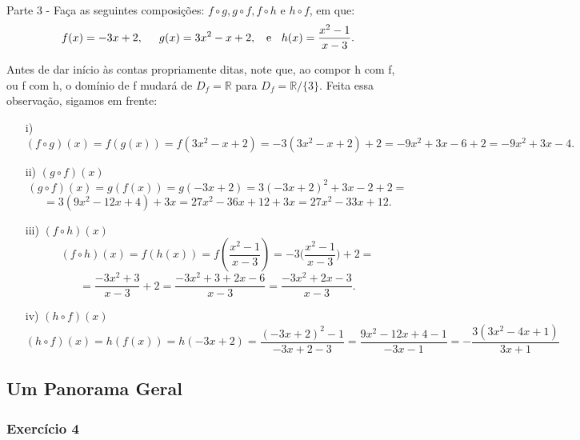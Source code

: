 \documentclass[Calculus1/exercícios_de_cálculo.tex]{subfiles}
\begin{document}
\paragraph{}Parte 3 - Faça as seguintes composições: $f\circ{g}, g\circ{f}, f\circ{h} \text{ e } h\circ{f}$, em que:
$$
	f(x) = -3x + 2, \hspace{0.5cm} g(x) = 3x^2 - x  + 2, \hspace{0.2cm} \text{ e } \hspace{0.2cm} h(x) = \frac{x^2 - 1}{x - 3}.
$$
\begin{sol*}
	Antes de dar início às contas propriamente ditas, note que, ao compor h com f, ou f com h, o dom\'inio de f mudará de $D_f = \mathbb{R}$ para $D_f = \mathbb{R}/\{3\}.$ Feita essa observação, sigamos em frente:
	\begin{itemize}
		\item[i)]$$(f\circ{g})(x) = f(g(x)) = f(3x^2 - x + 2) = -3(3x^2 - x + 2) + 2 = -9x^2 + 3x - 6 + 2 = -9x^2 + 3x - 4.$$
		\item[ii)]$(g\circ{f})(x)$
		      $$
			      (g\circ{f})(x) = g(f(x)) = g(-3x + 2) = 3(-3x + 2)^2 +3x - 2 + 2 =
		      $$
		      $$
			      = 3(9x^2 - 12x + 4) + 3x = 27x^2 - 36x + 12 + 3x = 27x^2 - 33x + 12.
		      $$
		\item[iii)]$(f\circ{h})(x)$
		      $$
			      (f\circ{h})(x) = f(h(x)) = f(\frac{x^2 - 1}{x - 3}) = -3\biggl(\frac{x^2 - 1}{x - 3}\biggr) + 2 =
		      $$
		      $$
			      = \frac{-3x^2 + 3}{x-3} + 2 = \frac{-3x^2 + 3 + 2x - 6}{x-3} = \frac{-3x^2 + 2x -3}{x-3}.
		      $$
		\item[iv)]$(h\circ{f})(x) $
		      $$
			      (h\circ{f})(x) = h(f(x)) = h(-3x + 2) = \frac{(-3x + 2)^2 - 1}{-3x+2 - 3} = \frac{9x^2 -12x + 4 - 1}{-3x -1} = -\frac{3(3x^2 - 4x + 1)}{3x+1}
		      $$
	\end{itemize}
	\qedsymbol
\end{sol*}
\subsection{Um Panorama Geral}
\subsubsection{Exercício 4}
\end{document}
